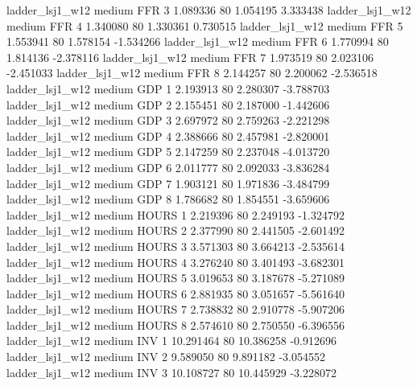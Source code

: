     ladder_lsj1_w12     medium      FFR                 3  1.089336 80       1.054195           3.333438
    ladder_lsj1_w12     medium      FFR                 4  1.340080 80       1.330361           0.730515
    ladder_lsj1_w12     medium      FFR                 5  1.553941 80       1.578154          -1.534266
    ladder_lsj1_w12     medium      FFR                 6  1.770994 80       1.814136          -2.378116
    ladder_lsj1_w12     medium      FFR                 7  1.973519 80       2.023106          -2.451033
    ladder_lsj1_w12     medium      FFR                 8  2.144257 80       2.200062          -2.536518
    ladder_lsj1_w12     medium      GDP                 1  2.193913 80       2.280307          -3.788703
    ladder_lsj1_w12     medium      GDP                 2  2.155451 80       2.187000          -1.442606
    ladder_lsj1_w12     medium      GDP                 3  2.697972 80       2.759263          -2.221298
    ladder_lsj1_w12     medium      GDP                 4  2.388666 80       2.457981          -2.820001
    ladder_lsj1_w12     medium      GDP                 5  2.147259 80       2.237048          -4.013720
    ladder_lsj1_w12     medium      GDP                 6  2.011777 80       2.092033          -3.836284
    ladder_lsj1_w12     medium      GDP                 7  1.903121 80       1.971836          -3.484799
    ladder_lsj1_w12     medium      GDP                 8  1.786682 80       1.854551          -3.659606
    ladder_lsj1_w12     medium    HOURS                 1  2.219396 80       2.249193          -1.324792
    ladder_lsj1_w12     medium    HOURS                 2  2.377990 80       2.441505          -2.601492
    ladder_lsj1_w12     medium    HOURS                 3  3.571303 80       3.664213          -2.535614
    ladder_lsj1_w12     medium    HOURS                 4  3.276240 80       3.401493          -3.682301
    ladder_lsj1_w12     medium    HOURS                 5  3.019653 80       3.187678          -5.271089
    ladder_lsj1_w12     medium    HOURS                 6  2.881935 80       3.051657          -5.561640
    ladder_lsj1_w12     medium    HOURS                 7  2.738832 80       2.910778          -5.907206
    ladder_lsj1_w12     medium    HOURS                 8  2.574610 80       2.750550          -6.396556
    ladder_lsj1_w12     medium      INV                 1 10.291464 80      10.386258          -0.912696
    ladder_lsj1_w12     medium      INV                 2  9.589050 80       9.891182          -3.054552
    ladder_lsj1_w12     medium      INV                 3 10.108727 80      10.445929          -3.228072
